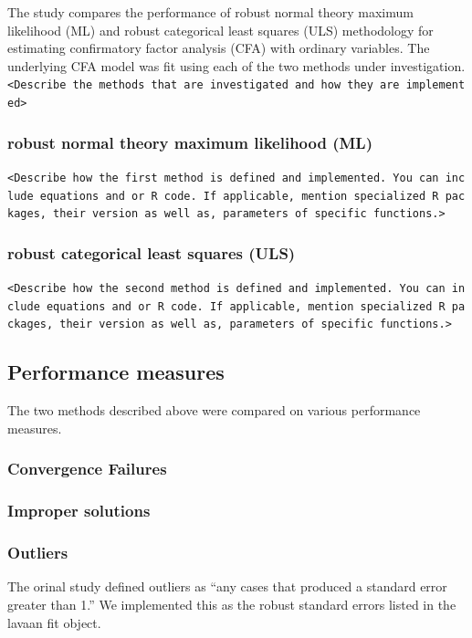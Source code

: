 \documentclass[10,a4paperpaper,]{article}
\begin{document}
The study compares the performance of robust normal theory maximum
likelihood (ML) and robust categorical least squares (ULS) methodology
for estimating confirmatory factor analysis (CFA) with ordinary
variables. The underlying CFA model was fit using each of the two
methods under investigation.
\texttt{\textless{}Describe\ the\ methods\ that\ are\ investigated\ and\ how\ they\ are\ implemented\textgreater{}}

\subsubsection{robust normal theory maximum likelihood (ML)}

\texttt{\textless{}Describe\ how\ the\ first\ method\ is\ defined\ and\ implemented.\ You\ can\ include\ equations\ and\ or\ R\ code.\ If\ applicable,\ mention\ specialized\ R\ packages,\ their\ version\ as\ well\ as,\ parameters\ of\ specific\ functions.\textgreater{}}

\subsubsection{robust categorical least squares (ULS)}

\texttt{\textless{}Describe\ how\ the\ second\ method\ is\ defined\ and\ implemented.\ You\ can\ include\ equations\ and\ or\ R\ code.\ If\ applicable,\ mention\ specialized\ R\ packages,\ their\ version\ as\ well\ as,\ parameters\ of\ specific\ functions.\textgreater{}}

\subsection{Performance measures}

The two methods described above were compared on various performance
measures.

\subsubsection{Convergence Failures}
\subsubsection{Improper solutions}
\subsubsection{Outliers}

The orinal study defined outliers as ``any cases that produced a
standard error greater than 1.'' We implemented this as the robust
standard errors listed in the lavaan fit object.
\end{document}
